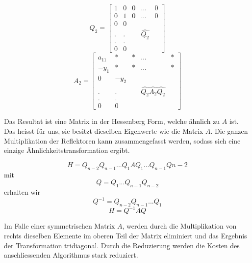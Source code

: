 \begin{equation}
	Q_{2}=
	\begin{bmatrix}
	1 & 0 & 0 & ... & 0\\
	0 & 1 & 0 & ... & 0\\
	0 & 0 &\\
	. & . & &\hat{Q_2} &\\
	. & . &\\
	0 & 0 &
	\end{bmatrix}
\end{equation}	
\begin{equation}
	A_{2}=
	\begin{bmatrix}
	a_{11} & * & * & ... & *\\
	-y_{1} & * & * & ... & *\\
	0 & -y_{2} &\\
	. & . & &\hat{Q_2}\hat{A_{2}}\hat{Q_2} &\\
	. & . &\\
	0 & 0 &
	\end{bmatrix}
\end{equation}

Das Resultat ist eine Matrix in der Hessenberg Form, welche ähnlich zu $A$ ist.
Das heisst für uns, sie besitzt dieselben Eigenwerte wie die Matrix $A$.
Die ganzen Multiplikation der Reflektoren kann zusammengefasst werden, sodass sich eine einzige Ähnlichkeitstransformation ergibt.

\begin{equation}
	H=Q_{n-2}Q_{n-1}...Q_{1}AQ_{1}...Q_{n-1}Q{n-2}
\end{equation}
mit 
\begin{equation}
	Q=Q_{1}...Q_{n-1}Q_{n-2}
\end{equation}
erhalten wir
\begin{equation}
	Q^{-1} = Q_{n-2}Q_{n-1}...Q_{1}
\end{equation}
\begin{equation}
H=Q^{-1}AQ
\end{equation}

Im Falle einer symmetrischen Matrix $A$, werden durch die Multiplikation von rechts dieselben Elemente im oberen Teil der Matrix eliminiert und das Ergebnis der Transformation tridiagonal.
Durch die Reduzierung werden die Kosten des anschliessenden Algorithmus stark reduziert.
